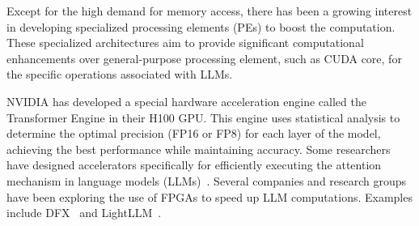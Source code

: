 
Except for the high demand for memory access, there has been a growing interest in developing specialized processing elements (PEs) to boost the computation. 
These specialized architectures aim to provide significant computational enhancements over general-purpose processing element, such as CUDA core, for the specific operations associated with LLMs.

NVIDIA has developed a special hardware acceleration engine called the Transformer Engine in their H100 GPU. This engine uses statistical analysis to determine the optimal precision (FP16 or FP8) for each layer of the model, achieving the best performance while maintaining accuracy.
Some researchers have designed accelerators specifically for efficiently executing the attention mechanism in language models (LLMs)~\citep{kao2023flat,qin2023fact}.
Several companies and research groups have been exploring the use of FPGAs to speed up LLM computations. Examples include DFX~\citep{hong2022dfx} and LightLLM~\citep{zeng2024flightllm}.


